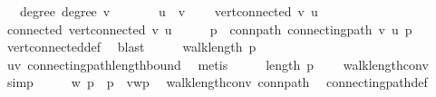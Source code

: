 \begin{isabellebody}
\ \ \ degree{\isacharunderscore}{\kern0pt}{}{\isacharcolon}{\kern0pt}\ {\isachardoublequoteopen}degree\ v\ {\isacharequal}{\kern0pt}\ {}{\isachardoublequoteclose}\isanewline
\ \ \ \ \ {\isachardoublequoteopen}u\ {\isasymnoteq}\ v{\isachardoublequoteclose}\isanewline
\ \ \ {\isachardoublequoteopen}{\isasymnot}\ vert{\isacharunderscore}{\kern0pt}connected\ v\ u{\isachardoublequoteclose}\isanewline
%
\isadelimproof
%
\endisadelimproof
%
\isatagproof
{}\isamarkupfalse%
\isanewline
\ \ \isamarkupfalse%
\ connected{\isacharcolon}{\kern0pt}\ {\isachardoublequoteopen}vert{\isacharunderscore}{\kern0pt}connected\ v\ u{\isachardoublequoteclose}\isanewline
\ \ \isamarkupfalse%
\ \isamarkupfalse%
\ p\ \ conn{\isacharunderscore}{\kern0pt}path{\isacharcolon}{\kern0pt}\ {\isachardoublequoteopen}connecting{\isacharunderscore}{\kern0pt}path\ v\ u\ p{\isachardoublequoteclose}\ \isamarkupfalse%
\ vert{\isacharunderscore}{\kern0pt}connected{\isacharunderscore}{\kern0pt}def\ \isamarkupfalse%
\ blast\isanewline
\ \ \isamarkupfalse%
\ \isamarkupfalse%
\ {\isachardoublequoteopen}walk{\isacharunderscore}{\kern0pt}length\ p\ {\isasymge}\ {}{\isachardoublequoteclose}\ \isamarkupfalse%
\ {\isacartoucheopen}u{\isasymnoteq}v{\isacartoucheclose}\ connecting{\isacharunderscore}{\kern0pt}path{\isacharunderscore}{\kern0pt}length{\isacharunderscore}{\kern0pt}bound\ \isamarkupfalse%
\ metis\isanewline
\ \ \isamarkupfalse%
\ \isamarkupfalse%
\ {\isachardoublequoteopen}length\ p\ {\isasymge}\ {}{\isachardoublequoteclose}\ \isamarkupfalse%
\ walk{\isacharunderscore}{\kern0pt}length{\isacharunderscore}{\kern0pt}conv\ \isamarkupfalse%
\ simp\isanewline
\ \ \isamarkupfalse%
\ \isamarkupfalse%
\ w\ p{\isacharprime}{\kern0pt}\ \ {\isachardoublequoteopen}p\ {\isacharequal}{\kern0pt}\ v{\isacharhash}{\kern0pt}w{\isacharhash}{\kern0pt}p{\isacharprime}{\kern0pt}{\isachardoublequoteclose}\ \isamarkupfalse%
\ walk{\isacharunderscore}{\kern0pt}length{\isacharunderscore}{\kern0pt}conv\ conn{\isacharunderscore}{\kern0pt}path\ \isamarkupfalse%
\ connecting{\isacharunderscore}{\kern0pt}path{\isacharunderscore}{\kern0pt}def\isanewline
\ \ \ \ \isamarkupfalse%

\end{isabellebody}
